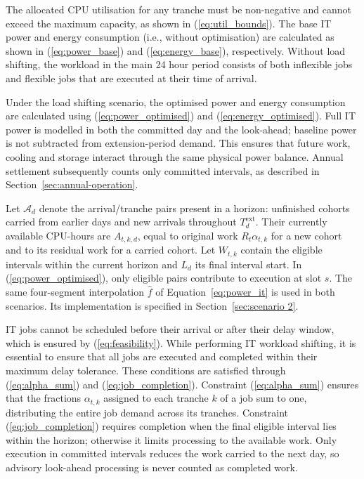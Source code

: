 \documentclass[lettersize,journal]{IEEEtran}
\begin{document}
The allocated CPU utilisation for any tranche must be non-negative and cannot exceed the maximum capacity, as shown in (\ref{eq:util_bounds}). The base IT power and energy consumption (i.e., without optimisation) are calculated as shown in (\ref{eq:power_base}) and (\ref{eq:energy_base}), respectively. Without load shifting, the workload in the main 24 hour period consists of both inflexible jobs and flexible jobs that are executed at their time of arrival.

Under the load shifting scenario, the optimised power and energy consumption are calculated using (\ref{eq:power_optimised}) and (\ref{eq:energy_optimised}). Full IT power is modelled in both the committed day and the look-ahead; baseline power is not subtracted from extension-period demand. This ensures that future work, cooling and storage interact through the same physical power balance. Annual settlement subsequently counts only committed intervals, as described in Section~\ref{sec:annual-operation}.

Let $\mathcal A_d$ denote the arrival/tranche pairs present in a horizon: unfinished cohorts carried from earlier days and new arrivals throughout $T_d^{\mathrm{ext}}$. Their currently available CPU-hours are $A_{t,k,d}$, equal to original work $R_t\alpha_{t,k}$ for a new cohort and to its residual work for a carried cohort. Let $W_{t,k}$ contain the eligible intervals within the current horizon and $L_d$ its final interval start. In (\ref{eq:power_optimised}), only eligible pairs contribute to execution at slot $s$. The same four-segment interpolation $\widehat f$ of Equation~\eqref{eq:power_it} is used in both scenarios. Its implementation is specified in Section~\ref{sec:scenario 2}.

IT jobs cannot be scheduled before their arrival or after their delay window, which is ensured by (\ref{eq:feasibility}). While performing IT workload shifting, it is essential to ensure that all jobs are executed and completed within their maximum delay tolerance. These conditions are satisfied through (\ref{eq:alpha_sum}) and (\ref{eq:job_completion}). Constraint (\ref{eq:alpha_sum}) ensures that the fractions $\alpha_{t,k}$ assigned to each tranche $k$ of a job sum to one, distributing the entire job demand across its tranches. Constraint (\ref{eq:job_completion}) requires completion when the final eligible interval lies within the horizon; otherwise it limits processing to the available work. Only execution in committed intervals reduces the work carried to the next day, so advisory look-ahead processing is never counted as completed work.
\end{document}

